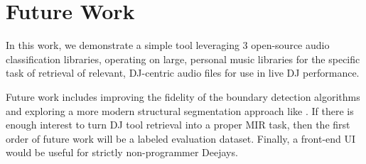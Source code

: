 \documentclass{article}
\begin{document}
\section{Future Work}

In this work, we demonstrate a simple tool leveraging 3 open-source audio classification libraries, operating on large, personal music libraries for the specific task of retrieval of relevant, DJ-centric audio files for use in live DJ performance. 

Future work includes improving the fidelity of the boundary detection algorithms and exploring a more modern structural segmentation approach like \cite{kim2023all}. If there is enough interest to turn DJ tool retrieval into a proper MIR task, then the first order of future work will be a labeled evaluation dataset. Finally, a front-end UI would be useful for strictly non-programmer Deejays.


\end{document}
